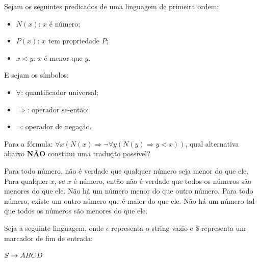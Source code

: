 \documentclass[12pt, addpoints]{exam}
\begin{document}
\begin{questions}
\question

Sejam os seguintes predicados de uma linguagem de primeira ordem:



\begin{itemize}

    \item \( N(x) \): \( x \) é número;

    \item \( P(x) \): \( x \) tem propriedade \( P \);

    \item \( x < y \): \( x \) é menor que \( y \).

\end{itemize}



E sejam os símbolos:

\begin{itemize}

    \item \( \forall \): quantificador universal;

    \item \( \Rightarrow \): operador se-então;

    \item \( \neg \): operador de negação.

\end{itemize}



Para a fórmula: \( \forall x (N(x) \Rightarrow \neg \forall y (N(y) \Rightarrow y < x)) \), qual alternativa abaixo \textbf{NÃO} constitui uma tradução possível?


\begin{choices}
\choice Para todo número, não é verdade que qualquer número seja menor do que ele.
\choice Para qualquer \( x \), se \( x \) é número, então não é verdade que todos os números são menores do que ele.
\choice Não há um número menor do que outro número.
\choice Para todo número, existe um outro número que é maior do que ele.
\choice Não há um número tal que todos os números são menores do que ele.
\end{choices}

\question

Seja a seguinte linguagem, onde \(\epsilon\) representa o string vazio e \$ representa um marcador de fim de entrada:



$S \rightarrow ABCD \\$\\


\end{questions}
\end{document}
